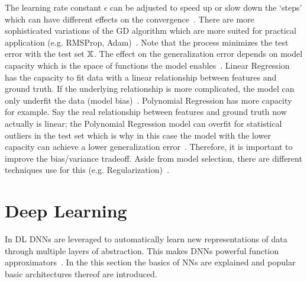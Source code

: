 The learning rate constant $\epsilon$ can be adjusted to speed up or slow down the `steps' which
can have different effects on the convergence~\citep{goodfellow_deep_2016}.
There are more sophisticated variations of the \ac{GD} algorithm which are more suited for practical
application (e.g. RMSProp, Adam)~\citep{geron_hands-machine_2017}.
Note that the process minimizes the test error with the test set $\mathbb{X}$.
The effect on the generalization error depends on model capacity which is the space of functions
the model enables~\citep{goodfellow_deep_2016}.
Linear Regression has the capacity to fit data with a linear relationship between features and
ground truth.
If the underlying relationship is more complicated, the model can only underfit the data (model
bias)~\citep{goodfellow_deep_2016}.
Polynomial Regression has more capacity for example.
Say the real relationship between features and ground truth now actually is linear;
the Polynomial Regression model can overfit for statistical outliers in the test set which is why
in this case the model with the lower capacity can achieve a lower generalization
error~\citep{geron_hands-machine_2017}.
Therefore, it is important to improve the bias/variance tradeoff.
Aside from model selection, there are different techniques use for this (e.g.
Regularization)~\citep{goodfellow_deep_2016}.

\section{Deep Learning}
In \ac{DL} \acp{DNN} are leveraged to automatically learn new representations of data through
multiple layers of abstraction.
This makes \acp{DNN} powerful function approximators~\citep{goodfellow_deep_2016}.
In the this section the basics of \acp{NN} are explained and popular basic architectures thereof are
introduced.

